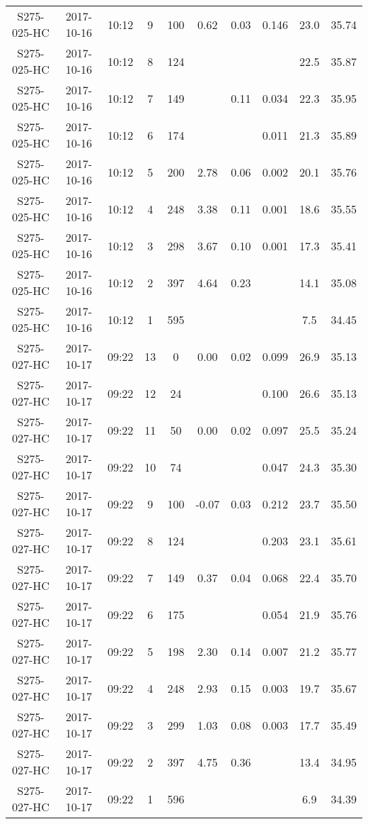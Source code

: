 \begin{longtable}{cccccccccc}
  S275-025-HC & 2017-10-16 & 10:12 & 9 & 100 & 0.62 & 0.03 & 0.146 & 23.0 & 35.74 \\ 
  S275-025-HC & 2017-10-16 & 10:12 & 8 & 124 &  &  &  & 22.5 & 35.87 \\ 
  S275-025-HC & 2017-10-16 & 10:12 & 7 & 149 &  & 0.11 & 0.034 & 22.3 & 35.95 \\ 
  S275-025-HC & 2017-10-16 & 10:12 & 6 & 174 &  &  & 0.011 & 21.3 & 35.89 \\ 
  S275-025-HC & 2017-10-16 & 10:12 & 5 & 200 & 2.78 & 0.06 & 0.002 & 20.1 & 35.76 \\ 
  S275-025-HC & 2017-10-16 & 10:12 & 4 & 248 & 3.38 & 0.11 & 0.001 & 18.6 & 35.55 \\ 
  S275-025-HC & 2017-10-16 & 10:12 & 3 & 298 & 3.67 & 0.10 & 0.001 & 17.3 & 35.41 \\ 
  S275-025-HC & 2017-10-16 & 10:12 & 2 & 397 & 4.64 & 0.23 &  & 14.1 & 35.08 \\ 
  S275-025-HC & 2017-10-16 & 10:12 & 1 & 595 &  &  &  & 7.5 & 34.45 \\ 
  S275-027-HC & 2017-10-17 & 09:22 & 13 & 0 & 0.00 & 0.02 & 0.099 & 26.9 & 35.13 \\ 
  S275-027-HC & 2017-10-17 & 09:22 & 12 & 24 &  &  & 0.100 & 26.6 & 35.13 \\ 
  S275-027-HC & 2017-10-17 & 09:22 & 11 & 50 & 0.00 & 0.02 & 0.097 & 25.5 & 35.24 \\ 
  S275-027-HC & 2017-10-17 & 09:22 & 10 & 74 &  &  & 0.047 & 24.3 & 35.30 \\ 
  S275-027-HC & 2017-10-17 & 09:22 & 9 & 100 & -0.07 & 0.03 & 0.212 & 23.7 & 35.50 \\ 
  S275-027-HC & 2017-10-17 & 09:22 & 8 & 124 &  &  & 0.203 & 23.1 & 35.61 \\ 
  S275-027-HC & 2017-10-17 & 09:22 & 7 & 149 & 0.37 & 0.04 & 0.068 & 22.4 & 35.70 \\ 
  S275-027-HC & 2017-10-17 & 09:22 & 6 & 175 &  &  & 0.054 & 21.9 & 35.76 \\ 
  S275-027-HC & 2017-10-17 & 09:22 & 5 & 198 & 2.30 & 0.14 & 0.007 & 21.2 & 35.77 \\ 
  S275-027-HC & 2017-10-17 & 09:22 & 4 & 248 & 2.93 & 0.15 & 0.003 & 19.7 & 35.67 \\ 
  S275-027-HC & 2017-10-17 & 09:22 & 3 & 299 & 1.03 & 0.08 & 0.003 & 17.7 & 35.49 \\ 
  S275-027-HC & 2017-10-17 & 09:22 & 2 & 397 & 4.75 & 0.36 &  & 13.4 & 34.95 \\ 
  S275-027-HC & 2017-10-17 & 09:22 & 1 & 596 &  &  &  & 6.9 & 34.39 \\ 

\end{longtable}
